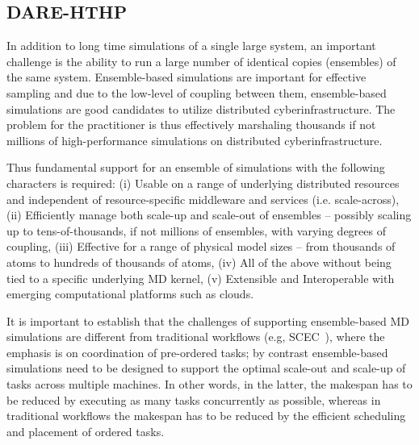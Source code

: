 \documentclass[]{svjour3}
\begin{document}

\subsection{DARE-HTHP}

In addition to long time simulations of a single large system, an
important challenge is the ability to run a large number of identical
copies (ensembles) of the same system. Ensemble-based simulations are
important for effective sampling and due to the low-level of coupling
between them, ensemble-based simulations are good candidates to
utilize distributed cyberinfrastructure.  The problem for the
practitioner is thus effectively marshaling thousands if not millions
of high-performance simulations on distributed cyberinfrastructure.

Thus fundamental support for an ensemble of simulations with the
following characters is required: (i) Usable on a range of underlying
distributed resources and independent of resource-specific middleware
and services (i.e. scale-across), (ii) Efficiently manage both
scale-up and scale-out of ensembles -- possibly scaling up to
tens-of-thousands, if not millions of ensembles, with varying degrees
of coupling, (iii) Effective for a range of physical model sizes --
from thousands of atoms to hundreds of thousands of atoms, (iv) All of
the above without being tied to a specific underlying MD kernel, (v)
Extensible and Interoperable with emerging computational platforms
such as clouds.

It is important to establish that the challenges of supporting
ensemble-based MD simulations are different from traditional workflows
(e.g, SCEC~\cite{scec-sc10}), where the emphasis is on coordination of
pre-ordered tasks; by contrast ensemble-based simulations need to be
designed to support the optimal scale-out and scale-up of tasks across
multiple machines. In other words, in the latter, the makespan has to
be reduced by executing as many tasks concurrently as possible,
whereas in traditional workflows the makespan has to be reduced by the
efficient scheduling and placement of ordered tasks.
\end{document}
